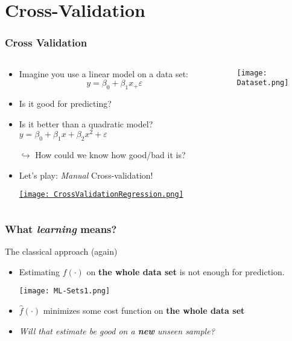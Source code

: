 \documentclass[xcolor=x11names,compress, aspectratio=169]{beamer}
\renewcommand{\(}{\begin{columns}}
\renewcommand{\)}{\end{columns}}
\newcommand{\<}[1]{\begin{column}{#1}}
\renewcommand{\>}{\end{column}}
\begin{document}
\section{Cross-Validation}

\begin{frame} %
\frametitle{Cross Validation}
\begin{columns}[t]
 \begin{column}{0.7\textwidth}
 \begin{itemize}[<+->]
    \item Imagine you use a linear model on a data set:  $$y = \beta_0 + \beta_1 x_ + \varepsilon$$
    \item  Is it good for predicting?
    \item Is it better than a quadratic model? $y = \beta_0 + \beta_1 x + \beta_2 x^2+ \varepsilon$
    \item[$\hookrightarrow$] How could we know how good/bad it is?
    \item Let's play:  \emph{Manual} Cross-validation!
    \item[]  \href{https://xtophedataviz.shinyapps.io/MLRegressionExample/}{\texttt{[image: CrossValidationRegression.png]}}
 \end{itemize}
 \end{column}
    \begin{column}{0.5\textwidth}
       \begin{itemize}
        \item[] \texttt{[image: Dataset.png]}
       \end{itemize}
    \end{column}
\end{columns}
\end{frame}


\begin{frame}
\frametitle{\textcolor{brique}{ What \emph{learning} means?}}
The classical approach (again)
\begin{itemize}
\item Estimating $f(\cdot)$ on \textbf{the whole data set} is not enough for prediction.
\item[] \texttt{[image: ML-Sets1.png]}
\item  $\widehat f(\cdot)$  minimizes some cost function on \textbf{the whole data set}
\item \emph{Will that estimate be good on a \textcolor[rgb]{1.00,0.00,0.00}{\textbf{new }} \emph{unseen} sample?}
\end{itemize}
\end{frame}
\end{document}
